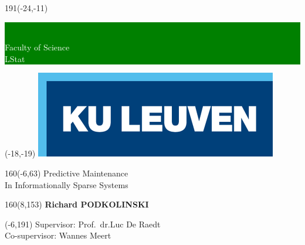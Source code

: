 \documentclass[12pt,a4paper]{book}
\begin{document}
\thispagestyle{empty}
\newcommand{\form}[1]{\scalebox{1.087}{\boldmath{#1}}}
\sffamily
%
\begin{textblock}{191}(-24,-11)
\colorbox{green}{\hspace{139mm}\ \parbox[c][18truemm]{52mm}{\textcolor{white}{Faculty of Science \\ LStat}}}
\end{textblock}
%
\begin{textblock}{70}(-18,-19)
\textblockcolour{}
\includegraphics*[height=19.8truemm]{img/LogoKULeuven}
\end{textblock}
%
\begin{textblock}{160}(-6,63)
\textblockcolour{}
\vspace{-\parskip}
\flushleft
\fontsize{40}{42}\selectfont \textcolor{bluetitle}{Predictive Maintenance}\\[1.5mm]
\fontsize{20}{22}\selectfont In Informationally Sparse Systems
\end{textblock}
%
%
\begin{textblock}{160}(8,153)
\textblockcolour{}
\vspace{-\parskip}
\flushright
\fontsize{14}{16}\selectfont \textbf{Richard PODKOLINSKI}
\end{textblock}
%
\begin{textblock}{70}(-6,191)
\textblockcolour{}
\vspace{-\parskip}
\flushleft
Supervisor: Prof.~dr.Luc De Raedt\\[4.5pt]
Co-supervisor: Wannes Meert\\[4.5pt]
\end{textblock}
\end{document}

